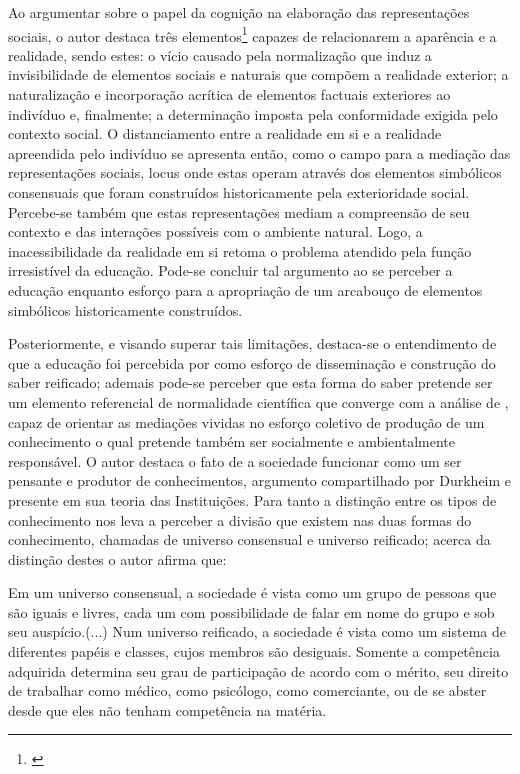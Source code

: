 \documentclass[
   article,       %
   12pt,          %
   oneside,       %
   a4paper,       %
   english,       %
   brazil,           %
   sumario=tradicional
   ]{abntex2}
\begin{document}
Ao argumentar sobre o papel da cognição na elaboração das representações sociais, o autor destaca três elementos\footnote{\cite[p.30-31]{Representacees_sociais_moscovici}} capazes de relacionarem a aparência e a realidade, sendo estes: o vício causado pela normalização que induz a invisibilidade de elementos sociais e naturais que compõem a realidade exterior; a naturalização e incorporação acrítica de elementos factuais exteriores ao indivíduo e, finalmente; a determinação imposta pela conformidade exigida pelo contexto social. O distanciamento entre a realidade em si e a realidade apreendida pelo indivíduo se apresenta então, como o campo para a mediação das representações sociais, locus onde estas operam através dos elementos simbólicos consensuais que foram construídos historicamente pela exterioridade social. Percebe-se também que estas representações mediam a compreensão de seu contexto e das interações possíveis com o ambiente natural. Logo, a inacessibilidade da realidade em si retoma o problema atendido pela função irresistível da educação. Pode-se concluir tal argumento ao se perceber a educação enquanto esforço para a apropriação de um arcabouço de elementos simbólicos historicamente construídos.

Posteriormente, e visando superar tais limitações, destaca-se o entendimento de que a educação foi percebida por \cite[p.49]{Representacees_sociais_moscovici} como esforço de disseminação e construção do saber reificado; ademais pode-se perceber que esta forma do saber pretende ser um elemento referencial de normalidade científica que converge com a análise de \cite{Kuhn2012-oa}, capaz de orientar as mediações vividas no esforço coletivo de produção de um conhecimento o qual pretende também ser socialmente e ambientalmente responsável. O autor destaca o fato de a sociedade funcionar como um ser pensante e produtor de conhecimentos, argumento compartilhado por Durkheim e presente em sua teoria das Instituições. Para tanto a distinção entre os tipos de conhecimento nos leva a perceber a divisão que existem nas duas formas do conhecimento, chamadas de universo consensual e universo reificado; acerca da distinção destes o autor afirma que:

\begin{citacao}
Em um universo consensual, a sociedade
é vista como um grupo de pessoas que são iguais e livres, cada um
com possibilidade de falar em nome do grupo e sob seu auspício.(...)
Num universo reificado, a sociedade é vista como um sistema
de diferentes papéis e classes, cujos membros são desiguais. 
Somente a competência adquirida determina seu grau de participação
de acordo com o mérito, seu direito de trabalhar como médico, 
como psicólogo, como comerciante, ou de se abster desde
que eles não tenham competência na matéria. \cite[p.50-51]{Representacees_sociais_moscovici}
\end{citacao}
\end{document}
